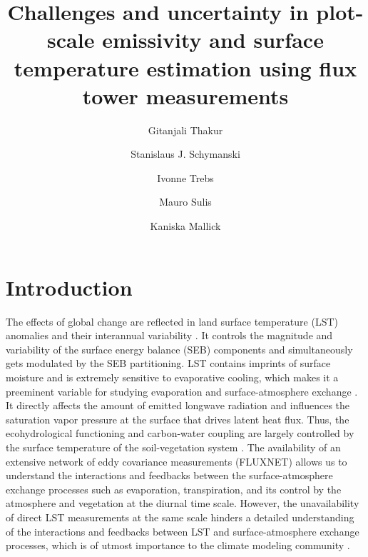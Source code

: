 \documentclass[fleqn,10pt]{wlscirep}
\title{ Challenges and uncertainty in plot-scale emissivity and surface temperature estimation using flux tower measurements}
\author[1,*]{Gitanjali Thakur}
\author[1,*]{ Stanislaus J. Schymanski}
\author[1]{Ivonne Trebs}
\author[1]{Mauro Sulis}
\author[1]{Kaniska Mallick }
\affil[1]{Luxembourg Institute of Science and Technology, ERIN, Belvaux, L-4422, Luxembourg}
\affil[*]{gitanjali.thakur90@gmail.com}
\affil[*]{stanislaus.schymanski@list.lu}
\begin{document}
%

\flushbottom
\maketitle
%
%
\thispagestyle{empty}


\section*{Introduction}

The effects of global change are reflected in land surface temperature (LST) anomalies and their interannual variability \cite{rowell2005scenario}. It controls the magnitude and variability of the surface energy balance (SEB) components and simultaneously gets modulated by the SEB partitioning\cite{mallick2015reintroducing,timmermans2007intercomparison}. LST contains imprints of surface moisture and is extremely sensitive to evaporative cooling, which makes it a preeminent variable for studying evaporation and surface-atmosphere exchange \cite{mallick2018critical,trebs2021role,kustas2009advances}. It directly affects the amount of emitted longwave radiation and influences the saturation vapor pressure at the surface that drives latent heat flux. Thus, the ecohydrological functioning and carbon-water coupling are largely controlled by the surface temperature of the soil-vegetation system \cite{still2021imaging}.
 The availability of an extensive network of eddy covariance measurements (FLUXNET) allows us to understand the interactions and feedbacks between the surface-atmosphere exchange processes such as evaporation, transpiration, and its control by the atmosphere and vegetation at the diurnal time scale. However, the unavailability of direct LST measurements at the same scale hinders a detailed understanding of the interactions and feedbacks between LST and surface-atmosphere exchange processes, which is of utmost importance to the climate modeling community \cite{migliavacca2021three}.
 
\end{document}
